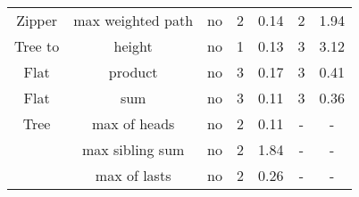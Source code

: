 \begin{table}
{\begin{tabular}[h]{|c|c|c|c|c|c|c|}
			Zipper & max weighted path & no & 2 & 0.14 & 2 & 1.94\\ 
			Tree to & height & no & 1 & 0.13 & 3 & 3.12\\ 
			\hline
			Flat & product & no & 3 & 0.17 & 3 & 0.41\\ 
			Flat & sum & no & 3 & 0.11 & 3 & 0.36\\ 
			Tree & max of heads & no & 2 & 0.11 & - & -\\ 
			 & max sibling sum & no & 2 & 1.84 & - & -\\ 
			 & max of lasts & no & 2 & 0.26 & - & -\\ 
			\hline
		\end{tabular}
	}
\end{table}
